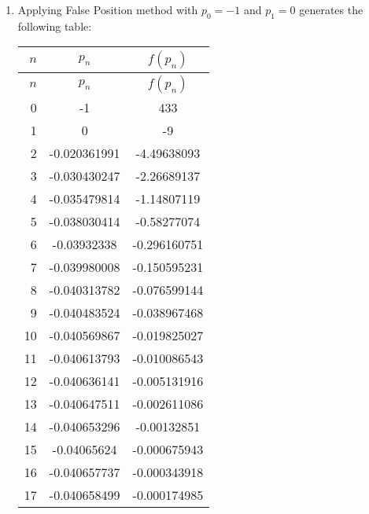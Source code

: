 \documentclass[../../../../Assignments]{subfiles}
\begin{document}
\begin{solution}
    \begin{enumerate}[label = \alph*)]
        \item Applying False Position method with \(p_0 = -1\) and \(p_1 = 0\)
            generates the following table:

            \begin{longtable}{r S[table-format=-1.9] S[table-format=3.9]}
                \toprule
                \(n\)  &    {\(p_n\)}    &   {\(f(p_n)\)}   \\
                \midrule
                \endfirsthead
                \(n\)  &    {\(p_n\)}    &   {\(f(p_n)\)}   \\
                \midrule
                  &  -1             &  433             \\
                    1  &   0             &   -9             \\
                    2  &  -0.020361991   &   -4.49638093    \\
                    3  &  -0.030430247   &   -2.26689137    \\
                    4  &  -0.035479814   &   -1.14807119    \\
                    5  &  -0.038030414   &   -0.58277074    \\
                    6  &  -0.03932338    &   -0.296160751   \\
                    7  &  -0.039980008   &   -0.150595231   \\
                    8  &  -0.040313782   &   -0.076599144   \\
                    9  &  -0.040483524   &   -0.038967468   \\
                   10  &  -0.040569867   &   -0.019825027   \\
                   11  &  -0.040613793   &   -0.010086543   \\
                   12  &  -0.040636141   &   -0.005131916   \\
                   13  &  -0.040647511   &   -0.002611086   \\
                   14  &  -0.040653296   &   -0.00132851    \\
                   15  &  -0.04065624    &   -0.000675943   \\
                   16  &  -0.040657737   &   -0.000343918   \\
                   17  &  -0.040658499   &   -0.000174985   \\
                \bottomrule
            \end{longtable}


\end{enumerate}
\end{solution}
\end{document}
